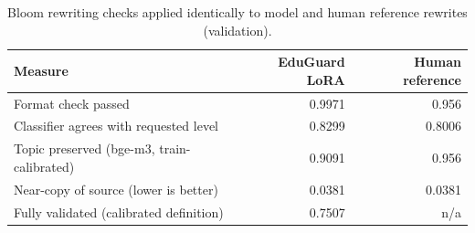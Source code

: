 \begin{table}[t]
\centering
\caption{Bloom rewriting checks applied identically to model and human reference rewrites (validation).}
\label{tab:t7_bloom_model_vs_reference}
\begin{tabular}{lrr}
\toprule
Measure & EduGuard LoRA & Human reference \\
\midrule
Format check passed & 0.9971 & 0.956 \\
Classifier agrees with requested level & 0.8299 & 0.8006 \\
Topic preserved (bge-m3, train-calibrated) & 0.9091 & 0.956 \\
Near-copy of source (lower is better) & 0.0381 & 0.0381 \\
Fully validated (calibrated definition) & 0.7507 & n/a \\
\bottomrule
\end{tabular}
\end{table}
